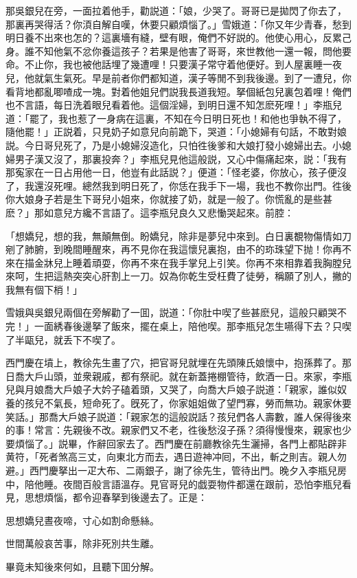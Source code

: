 那吳銀兒在旁，一面拉着他手，勸説道：「娘，少哭了。哥哥已是拋閃了你去了，那裏再哭得活？你湏自解自嘆，休要只顧煩惱了。」雪娥道：「你又年少青春，愁到明日養不出來也怎的？這裏墻有縫，壁有眼，俺們不好説的。他使心用心，反累己身。誰不知他氣不忿你養這孩子？若果是他害了哥哥，來世教他一還一報，問他要命。不止你，我也被他話埋了幾遭哩！只要漢子常守着他便好。到人屋裏睡一夜兒，他就氣生氣死。早是前者你們都知道，漢子等閒不到我後邊。到了一遭兒，你看背地都亂唧喳成一塊。對着他姐兒們説我長道我短。拏個紙包兒裏包着哩！俺們也不言語，每日洗着眼兒看着他。這個淫婦，到明日還不知怎麽死哩！」李瓶兒道：「罷了，我也惹了一身病在這裏，不知在今日明日死也！和他也爭執不得了，隨他罷！」正説着，只見奶子如意兒向前跪下，哭道：「小媳婦有句話，不敢對娘説。今日哥兒死了，乃是小媳婦沒造化，只怕徃後爹和大娘打發小媳婦出去。小媳婦男子漢又沒了，那裏投奔？」李瓶兒見他這般説，又心中傷痛起來，説：「我有那寃家在一日占用他一日，他豈有此話説？」便道：「怪老婆，你放心，孩子便沒了，我還沒死哩。總然我到明日死了，你恁在我手下一場，我也不教你出門。徃後你大娘身子若是生下哥兒小姐來，你就接了奶，就是一般了。你慌亂的是些甚麽？」那如意兒方纔不言語了。這李瓶兒良久又悲慟哭起來。前腔：

\begin{myquote}
「想嬌兒，想的我，無顛無倒。盼嬌兒，除非是夢兒中來到。白日裏覩物傷情如刀剜了肺腑，到晚間睡醒來，再不見你在我這懷兒裏抱，由不的珎珠望下抛！你再不來在描金牀兒上睡着頑耍，你再不來在我手掌兒上引笑。你再不來相靠着我胸膛兒來呵，生把這熱突突心肝割上一刀。奴為你乾生受枉費了徒勞，稱願了別人，撇的我無有個下梢！」
\end{myquote}

雪娥與吳銀兒兩個在旁解勸了一囬，説道：「你肚中喫了些甚麽兒，這般只顧哭不完！」一面綉春後邊拏了飯來，擺在桌上，陪他喫。那李瓶兒怎生嚥得下去？只喫了半甌兒，就丢下不喫了。

西門慶在墳上，教徐先生畫了穴，把官哥兒就埋在先頭陳氏娘懷中，抱孫葬了。那日喬大戶山頭，並衆親戚，都有祭祀。就在新蓋捲棚管待，飲酒一日。來家，李瓶兒與月娘喬大戶娘子大妗子磕着頭，又哭了，向喬大戶娘子説道：「親家，誰似奴養的孩兒不氣長，短命死了。旣死了，你家姐姐做了望門寡，勞而無功。親家休要笑話。」那喬大戶娘子説道：「親家怎的這般説話？孩兒們各人壽數，誰人保得後來的事！常言：先親後不改。親家們又不老，徃後愁沒子孫？須得慢慢來，親家也少要煩惱了。」説畢，作辭回家去了。西門慶在前廳教徐先生灑掃，各門上都貼辟非黄符，「死者煞高三丈，向東北方而去，遇日遊神冲囘，不出，斬之則吉。親人勿避。」西門慶拏出一疋大布、二兩銀子，謝了徐先生，管待出門。晚夕入李瓶兒房中，陪他睡。夜間百般言語溫存。見官哥兒的戯耍物件都還在跟前，恐怕李瓶兒看見，思想煩惱，都令迎春拏到後邊去了。正是：

\begin{myquote}
思想嬌兒晝夜啼，寸心如割命懸絲。

世間萬般哀苦事，除非死別共生離。
\end{myquote}

畢竟未知後來何如，且聽下囬分解。

